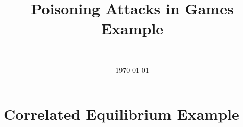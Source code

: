 \documentclass{article}
\title{Poisoning Attacks in Games Example}
\author{-}
\date{\today}
\begin{document}
\newtheorem{thm}{Theorem}
\newtheorem{cor}{Corollary}
\newtheorem{lem}{Lemma}
\newtheorem{prop}{Proposition}
\newtheorem{conj}{Conjecture}
\newtheorem{algo}{Algorithm}
\newtheorem{obs}{Observation}
\newtheorem{clm}{Claim}
\theoremstyle{definition}
\newtheorem{df}{Definition}
\newtheorem{eg}{Example}
\newtheorem{asm}{Assumption}
\newtheorem{cond}{Condition}
\theoremstyle{remark}
\newtheorem{rmk}{Remark}
\maketitle \onehalfspacing \allowdisplaybreaks \raggedbottom


\section{Correlated Equilibrium Example} 
\end{document}
